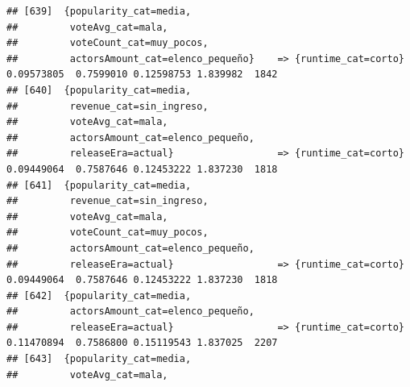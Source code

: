 \documentclass[
]{article}
\begin{document}
\begin{verbatim}
## [639]  {popularity_cat=media,                                                                                                   
##         voteAvg_cat=mala,                                                                                                       
##         voteCount_cat=muy_pocos,                                                                                                
##         actorsAmount_cat=elenco_pequeño}    => {runtime_cat=corto}               0.09573805  0.7599010 0.12598753 1.839982  1842
## [640]  {popularity_cat=media,                                                                                                   
##         revenue_cat=sin_ingreso,                                                                                                
##         voteAvg_cat=mala,                                                                                                       
##         actorsAmount_cat=elenco_pequeño,                                                                                        
##         releaseEra=actual}                  => {runtime_cat=corto}               0.09449064  0.7587646 0.12453222 1.837230  1818
## [641]  {popularity_cat=media,                                                                                                   
##         revenue_cat=sin_ingreso,                                                                                                
##         voteAvg_cat=mala,                                                                                                       
##         voteCount_cat=muy_pocos,                                                                                                
##         actorsAmount_cat=elenco_pequeño,                                                                                        
##         releaseEra=actual}                  => {runtime_cat=corto}               0.09449064  0.7587646 0.12453222 1.837230  1818
## [642]  {popularity_cat=media,                                                                                                   
##         actorsAmount_cat=elenco_pequeño,                                                                                        
##         releaseEra=actual}                  => {runtime_cat=corto}               0.11470894  0.7586800 0.15119543 1.837025  2207
## [643]  {popularity_cat=media,                                                                                                   
##         voteAvg_cat=mala,                                                                                                       

\end{verbatim}
\end{document}
